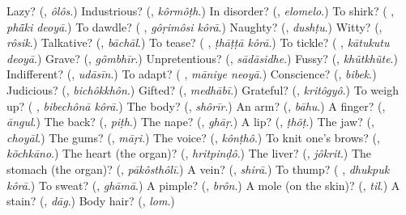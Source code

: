 \begin{tcolorbox}[breakable,colback=teal!4,colframe=teal!35!black,title={Before you move on}]
Lazy? (\textbf{}, \emph{ôlôs}.) Industrious? (\textbf{}, \emph{kôrmôṭh}.) In disorder? (\textbf{}, \emph{elomelo}.) To shirk? (\textbf{ }, \emph{phā̃ki deoyā}.) To dawdle? (\textbf{ }, \emph{gôṛimôsi kôrā}.) Naughty? (\textbf{}, \emph{dushṭu}.) Witty? (\textbf{}, \emph{rôsik}.) Talkative? (\textbf{}, \emph{bāchāl}.) To tease? (\textbf{ }, \emph{ṭhāṭṭā kôrā}.) To tickle? (\textbf{ }, \emph{kātukutu deoyā}.) Grave? (\textbf{}, \emph{gômbhīr}.) Unpretentious? (\textbf{}, \emph{sādāsidhe}.) Fussy? (\textbf{}, \emph{khũtkhũte}.) Indifferent? (\textbf{}, \emph{udāsīn}.) To adapt? (\textbf{ }, \emph{māniye neoyā}.) Conscience? (\textbf{}, \emph{bibek}.) Judicious? (\textbf{}, \emph{bichôkkhôn}.) Gifted? (\textbf{}, \emph{medhābī}.) Grateful? (\textbf{}, \emph{kritôgyô}.) To weigh up? (\textbf{ }, \emph{bibechônā kôrā}.) The body? (\textbf{}, \emph{shôrīr}.) An arm? (\textbf{}, \emph{bāhu}.) A finger? (\textbf{}, \emph{āngul}.) The back? (\textbf{}, \emph{piṭh}.) The nape? (\textbf{}, \emph{ghāṛ}.) A lip? (\textbf{}, \emph{ṭhõṭ}.) The jaw? (\textbf{}, \emph{choyāl}.) The gums? (\textbf{}, \emph{māṛi}.) The voice? (\textbf{}, \emph{kônṭhô}.) To knit one's brows? (\textbf{}, \emph{kõchkāno}.) The heart (the organ)? (\textbf{}, \emph{hritpinḍô}.) The liver? (\textbf{}, \emph{jôkrit}.) The stomach (the organ)? (\textbf{}, \emph{pākôsthôlī}.) A vein? (\textbf{}, \emph{shirā}.) To thump? (\textbf{ }, \emph{dhukpuk kôrā}.) To sweat? (\textbf{}, \emph{ghāmā}.) A pimple? (\textbf{}, \emph{brôn}.) A mole (on the skin)? (\textbf{}, \emph{til}.) A stain? (\textbf{}, \emph{dāg}.) Body hair? (\textbf{}, \emph{lom}.)
\end{tcolorbox}
